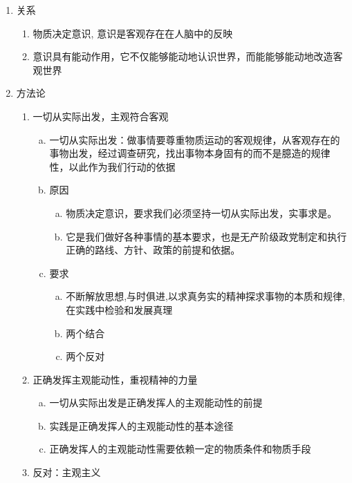 \documentclass[12pt]{book}
\begin{document}
\begin{enumerate}[1.]
    \item 关系
          \begin{enumerate}[(1)]
              \item 物质决定意识, 意识是客观存在在人脑中的反映
              \item 意识具有能动作用，它不仅能够能动地认识世界，而能能够能动地改造客观世界
          \end{enumerate}
    \item 方法论
          \begin{enumerate}[(1)]
              \item 一切从实际出发，主观符合客观
                    \begin{enumerate}[a.]
                        \item 一切从实际出发：做事情要尊重物质运动的客观规律，从客观存在的事物出发，经过调查研究，找出事物本身固有的而不是臆造的规律性，以此作为我们行动的依据
                        \item 原因
                              \begin{enumerate}[(a)]
                                  \item 物质决定意识，要求我们必须坚持一切从实际出发，实事求是。
                                  \item 它是我们做好各种事情的基本要求，也是无产阶级政党制定和执行正确的路线、方针、政策的前提和依据。
                              \end{enumerate}
                        \item 要求
                              \begin{enumerate}[(a)]
                                  \item 不断解放思想,与时俱进,以求真务实的精神探求事物的本质和规律,在实践中检验和发展真理
                                  \item 两个结合
                                  \item 两个反对
                              \end{enumerate}
                    \end{enumerate}
              \item 正确发挥主观能动性，重视精神的力量
                    \begin{enumerate}[a.]
                        \item 一切从实际出发是正确发挥人的主观能动性的前提
                        \item 实践是正确发挥人的主观能动性的基本途径
                        \item 正确发挥人的主观能动性需要依赖一定的物质条件和物质手段
                    \end{enumerate}
              \item 反对：主观主义
          \end{enumerate}
\end{enumerate}
\end{document}
